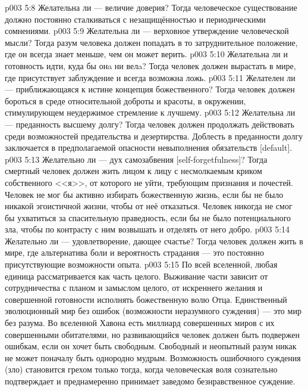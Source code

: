 \vs p003 5:8 \bibnobreakspace Желательна ли  --- величие доверия? Тогда человеческое существование должно постоянно сталкиваться с незащищённостью и периодическими сомнениями.
\vs p003 5:9 \bibnobreakspace Желательна ли  --- верховное утверждение человеческой мысли? Тогда разум человека должен попадать в то затруднительное положение, где он всегда знает меньше, чем он может верить.
\vs p003 5:10 \bibnobreakspace Желательна ли  и готовность идти, куда бы онa ни велa? Тогда человек должен вырастать в мире, где присутствует заблуждение и всегда возможна ложь.
\vs p003 5:11 \bibnobreakspace Желателен ли  --- приближающаяся к истине концепция божественного? Тогда человек должен бороться в среде относительной доброты и красоты, в окружении, стимулирующем неудержимое стремление к лучшему.
\vs p003 5:12 \bibnobreakspace Желательна ли  \bibemph{[loyalty]} --- преданность высшему долгу? Тогда человек должен продолжать действовать среди возможностей предательства и дезертирства. Доблесть в преданности долгу заключается в предполагаемой опасности невыполнения обязательств [default].
\vs p003 5:13 \bibnobreakspace Желательно ли  --- дух самозабвения [self\hyp{}forgetfulness]? Тогда смертный человек должен жить лицом к лицу с несмолкаемым криком собственного <<я>>, от которого не уйти, требующим признания и почестей. Человек не мог бы активно избирать божественную жизнь, если бы не было никакой эгоистичной жизни, чтобы от неё отказаться. Человек никогда не смог бы ухватиться за спасительную праведность, если бы не было потенциального зла, чтобы по контрасту с ним возвышать и отделять от него добро.
\vs p003 5:14 \bibnobreakspace Желательно ли  --- удовлетворение, дающее счастье? Тогда человек должен жить в мире, где альтернатива боли и вероятность страдания --- это постоянно присутствующие возможности опыта.
\vs p003 5:15 \pc По всей вселенной, любая единица рассматривается как часть целого. Выживание части зависит от сотрудничества с планом и замыслом целого, от искреннего желания и совершенной готовности исполнять божественную волю Отца. Единственный эволюционный мир без ошибок (возможности неразумного суждения) --- это мир без  разума. Во вселенной Хавона есть миллиард совершенных миров с их совершенными обитателями, но развивающийся человек должен быть подвержен ошибкам, если он хочет быть свободным. Свободный и неопытный разум никак не может поначалу быть однородно мудрым. Возможность ошибочного суждения (зло) становится грехом только тогда, когда человеческая воля сознательно подтверждает и преднамеренно принимает заведомо безнравственное суждение.
